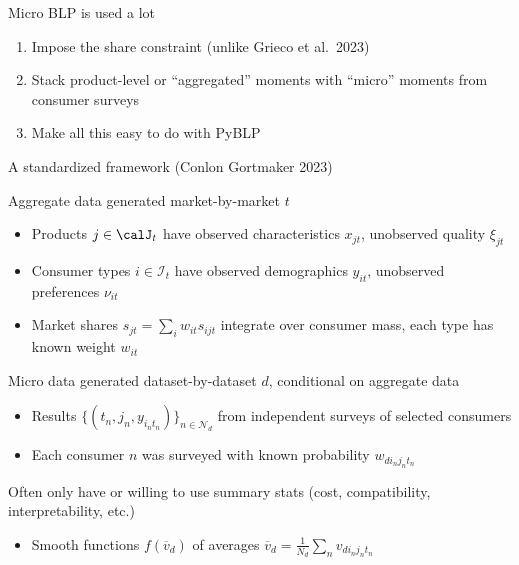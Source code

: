 \begin{frame}{Micro BLP is used a lot}
\begin{wideitemize}
        \begin{enumerate}
            \item Impose the \cite{berry1995automobile} share constraint (unlike {\color{light gray}Grieco et al.\ 2023}) \nocite{grieco2023conformant}
            \item Stack product-level or ``\alert{aggregated}'' moments with ``\alert{micro}'' moments from consumer surveys
            \item Make all this easy to do with \alert{PyBLP}
        \end{enumerate}
    \end{wideitemize}
\end{frame}

\begin{frame}[label=framework]{A standardized framework (Conlon Gortmaker 2023)}
    \begin{wideitemize}
        
        \item Aggregate data generated market-by-market $t$
        \begin{itemize}
            \item \alert{Products} $j \in \calJ_t$ have observed characteristics $x_{jt}$, unobserved quality $\xi_{jt}$
            \item \alert{Consumer types} $i \in \mathcal{I}_t$ have observed demographics $y_{it}$, unobserved preferences $\nu_{it}$
            \item \alert{Market shares} $s_{jt} = \sum_i w_{it} s_{ijt}$ integrate over consumer mass, each type has known weight $w_{it}$
        \end{itemize}
        
        \item Micro data generated dataset-by-dataset $d$, conditional on aggregate data
        \begin{itemize}
            \item Results $\{(t_n, j_n, y_{i_nt_n})\}_{n \in \mathcal{N}_d}$ from \alert{independent surveys} of \alert{selected consumers}
            \item Each consumer $n$ was surveyed with known probability $w_{di_nj_nt_n}$
        \end{itemize}
        
        \item Often only have or willing to use \alert{summary stats} (cost, compatibility, interpretability, etc.)
        \begin{itemize}
            \item Smooth functions $f(\overline{v}_d)$ of averages $\overline{v}_d = \frac{1}{N_d} \sum_n v_{di_nj_nt_n}$
        \end{itemize}
        

\end{wideitemize}
\end{frame}
